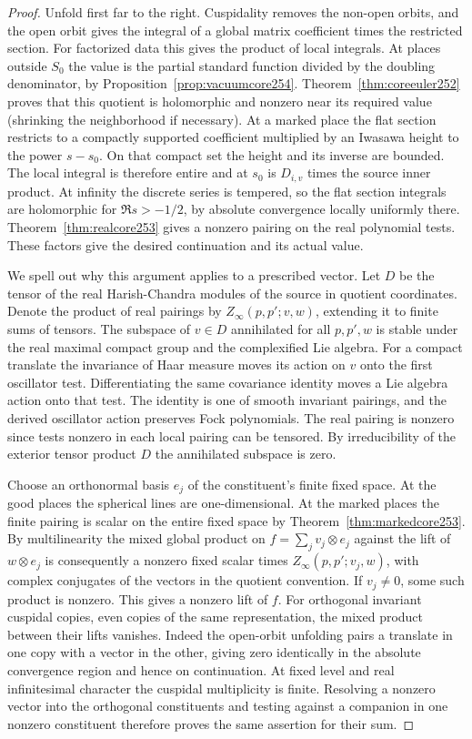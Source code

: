 \documentclass[a4paper,11pt]{article}
\theoremstyle{definition}
\theoremstyle{remark}
\numberwithin{equation}{section}
\begin{document}
\begin{proof}
Unfold first far to the right. Cuspidality removes the non-open
orbits, and the open orbit gives the integral of a global
matrix coefficient times the restricted section. For factorized
data this gives the product of local integrals. At places outside
\(S_0\) the value is the partial standard function divided by
the doubling denominator, by Proposition~\ref{prop:vacuumcore254}.
Theorem~\ref{thm:coreeuler252} proves that this quotient is
holomorphic and nonzero near its required value (shrinking the
neighborhood if necessary). At a marked place the flat section
restricts to a compactly supported coefficient multiplied by
an Iwasawa height to the power \(s-s_0\). On that compact set
the height and its inverse are bounded. The local integral is
therefore entire and at \(s_0\) is \(D_{i,v}\) times the
source inner product. At infinity the discrete series is
tempered, so the flat section integrals are holomorphic for
\(\Re s>-1/2\), by absolute convergence locally uniformly
there. Theorem~\ref{thm:realcore253} gives a nonzero pairing
on the real polynomial tests. These factors give the desired
continuation and its actual value.

We spell out why this argument applies to a prescribed vector.
Let \(D\) be the tensor of the real Harish-Chandra modules of
the source in quotient coordinates. Denote the product of real
pairings by \(Z_\infty(p,p';v,w)\), extending it to finite sums
of tensors. The subspace of \(v\in D\) annihilated for all
\(p,p',w\) is stable under the real maximal compact group and
the complexified Lie algebra. For a compact translate the
invariance of Haar measure moves its action on \(v\) onto the
first oscillator test. Differentiating the same covariance
identity moves a Lie algebra action onto that test. The
identity is one of smooth invariant pairings, and the derived
oscillator action preserves Fock polynomials. The real pairing
is nonzero since tests nonzero in each local pairing can be
tensored. By irreducibility of the exterior tensor product \(D\)
the annihilated subspace is zero.

Choose an orthonormal basis \(e_j\) of the constituent's
finite fixed space. At the good places the spherical lines are
one-dimensional. At the marked places the finite pairing is
scalar on the entire fixed space by
Theorem~\ref{thm:markedcore253}. By multilinearity the mixed
global product on \(f=\sum_j v_j\otimes e_j\) against the lift
of \(w\otimes e_j\) is consequently a nonzero fixed scalar
times \(Z_\infty(p,p';v_j,w)\), with complex conjugates of the
vectors in the quotient convention. If \(v_j\ne0\), some such
product is nonzero. This gives a nonzero lift of \(f\).
For orthogonal invariant cuspidal copies, even copies of the
same representation, the mixed product between their lifts
vanishes. Indeed the open-orbit unfolding pairs a translate
in one copy with a vector in the other, giving zero identically
in the absolute convergence region and hence on continuation.
At fixed level and real infinitesimal character the cuspidal
multiplicity is finite. Resolving a nonzero vector into the
orthogonal constituents and testing against a companion in one
nonzero constituent therefore proves the same assertion for
their sum.


\end{proof}
\end{document}
